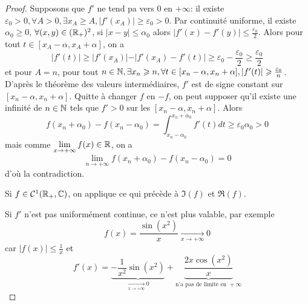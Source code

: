 \documentclass[12pt]{article}
\begin{document}
\begin{proof}
	Supposons que $f'$ ne tend pa vers 0 en $+\infty$: il existe $\varepsilon_{0}>0,\forall A>0,\exists x_{A}\geqslant A,\vert f'(x_{A})\vert\geqslant\varepsilon_{0}>0$. Par continuité uniforme, il existe $\alpha_{0}\geqslant0$, $\forall(x,y)\in(\mathbb{R}_{+})^{2}$, si $\vert x-y\vert\leqslant\alpha_{0}$ alors $\vert f'(x)-f'(y)\vert\leqslant\frac{\varepsilon_{0}}{2}$. Alors pour tout $t\in[x_{A}-\alpha,x_{A}+\alpha]$, on a 
	\begin{equation}\vert f'(t)\vert\geqslant \vert f'(x_{A})\vert-\vert f'(x_{A})-f'(t)\vert\geqslant\varepsilon_{0}-\frac{\varepsilon_{0}}{2}\geqslant\frac{\varepsilon_{0}}{2}\end{equation}
	et pour $A=n$, pour tout $n\in\mathbb{N},\exists x_{n}\geqslant n,\forall t\in[x_{n}-\alpha,x_{n}+\alpha],\vert f'(t)\vert\geqslant\frac{\varepsilon_{0}}{n}$. D'après le théorème des valeurs intermédiaires, $f'$ est de signe constant sur $[x_{n}-\alpha,x_{n}+\alpha]$. Quitte à changer $f$ en $-f$, on peut supposer qu'il existe une infinité de $n\in\mathbb{N}$ tels que $f'>0$ sur les $[x_{n}-\alpha,x_{n}+\alpha]$. Alors
	\begin{equation}f(x_{n}+\alpha_{0})-f(x_{n}-\alpha_{0})=\int_{x_{n}-\alpha_{0}}^{x_{n}+\alpha_{0}}f'(t)dt\geqslant\varepsilon_{0}\alpha_{0}>0\end{equation}
	mais comme $\lim\limits_{x\to+\infty}f(x)\in\mathbb{R}$, on a 
	\begin{equation}\lim\limits_{n\to+\infty}f(x_{n}+\alpha_{0})-f(x_{n}-\alpha_{0})=0\end{equation}
	d'où la contradiction.

	Si $f\in\mathcal{C}^{1}(\mathbb{R}_{+},\mathbb{C})$, on applique ce qui précède à $\Im(f)$ et $\Re(f)$. 

	Si $f'$ n'est pas uniformément continue, ce n'est plus valable, par exemple 
	\begin{equation}f(x)=\frac{\sin(x^{2})}{x}\xrightarrow[x\to+\infty]{}0\end{equation}
	car $\vert f(x)\vert\leqslant\frac{1}{x}$ et 
	\begin{equation}f'(x)=\underbrace{-\frac{1}{x^{2}}\sin(x^{2})}_{\xrightarrow[x\to+\infty]{}0}+\underbrace{\frac{2x\cos(x^{2})}{x}}_{\text{n'a pas de limite en }+\infty}\end{equation}
\end{proof}
\end{document}
